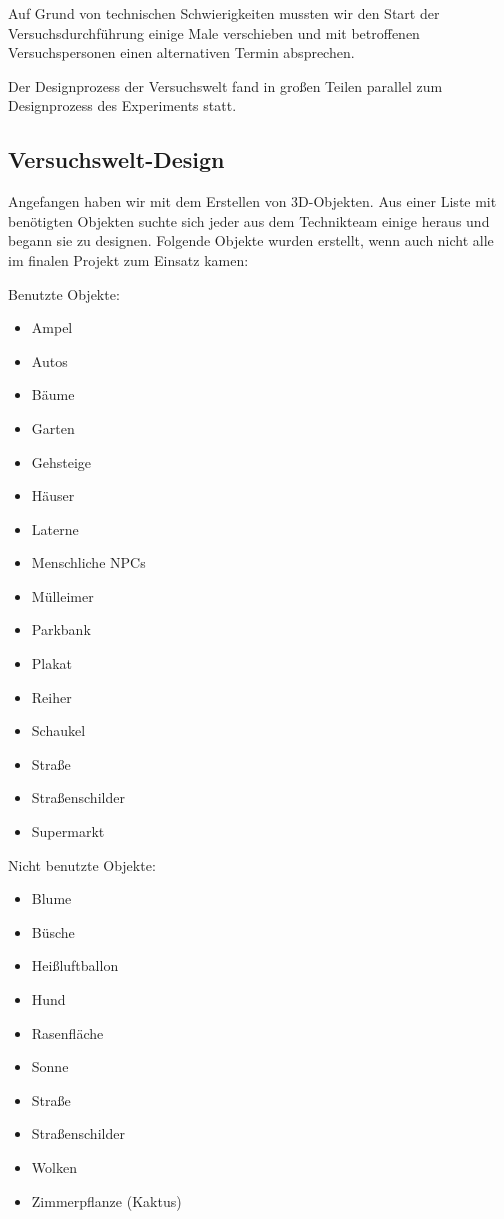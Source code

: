 \documentclass{Bericht}
\begin{document}
		Auf Grund von technischen Schwierigkeiten mussten wir den Start der Versuchsdurchführung einige Male verschieben und mit betroffenen Versuchspersonen einen alternativen Termin absprechen. 

		Der Designprozess der Versuchswelt fand in großen Teilen parallel zum Designprozess des Experiments statt. 
	
	\subsection{Versuchswelt-Design} %
		Angefangen haben wir mit dem Erstellen von 3D-Objekten. Aus einer Liste mit benötigten Objekten suchte sich jeder aus dem Technikteam einige heraus und begann sie zu designen. Folgende Objekte wurden erstellt, wenn auch nicht alle im finalen Projekt zum Einsatz kamen:

	\begin{minipage}[t]{0.5\textwidth}
	\vspace{1mm}
		Benutzte Objekte:
		\begin{itemize}
			\setlength{\itemsep}{0em}
			\item Ampel
			\item Autos
			\item Bäume
			\item Garten
			\item Gehsteige
			\item Häuser
			\item Laterne
			\item Menschliche NPCs
			\item Mülleimer
			\item Parkbank
			\item Plakat
			\item Reiher
			\item Schaukel
			\item Straße
			\item Straßenschilder
			\item Supermarkt
		\end{itemize}
	\vspace{1mm}
	\end{minipage}
	\begin{minipage}[t]{0.5\textwidth}
	\vspace{1mm}
		Nicht benutzte Objekte:
		\begin{itemize}
			\setlength{\itemsep}{0em}
			\item Blume
			\item Büsche
			\item Heißluftballon
			\item Hund
			\item Rasenfläche
			\item Sonne
			\item Straße
			\item Straßenschilder
			\item Wolken
			\item Zimmerpflanze (Kaktus)
		\end{itemize}
	\vspace{1mm}
	\end{minipage}
	
\end{document}
